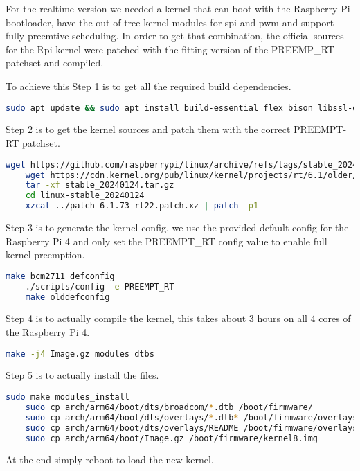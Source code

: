 For the realtime version we needed a kernel that can boot with the Raspberry Pi bootloader,
have the out-of-tree kernel modules for spi and pwm and support fully preemtive scheduling.
In order to get that combination, the official sources for the Rpi kernel were patched with the fitting version of the PREEMP\_RT patchset and compiled.

To achieve this Step 1 is to get all the required build dependencies.
\begin{lstlisting}[language=bash, breaklines]
    sudo apt update && sudo apt install build-essential flex bison libssl-dev bc
\end{lstlisting}

Step 2 is to get the kernel sources and patch them with the correct PREEMPT-RT patchset.
\begin{lstlisting}[language=bash, breaklines]
    wget https://github.com/raspberrypi/linux/archive/refs/tags/stable_20240124.tar.gz
    wget https://cdn.kernel.org/pub/linux/kernel/projects/rt/6.1/older/patch-6.1.73-rt22.patch.xz
    tar -xf stable_20240124.tar.gz
    cd linux-stable_20240124
    xzcat ../patch-6.1.73-rt22.patch.xz | patch -p1
\end{lstlisting}

Step 3 is to generate the kernel config, we use the provided default config for the Raspberry Pi 4 and only set the PREEMPT\_RT config value to enable full kernel preemption.
\begin{lstlisting}[language=bash, breaklines]
    make bcm2711_defconfig
    ./scripts/config -e PREEMPT_RT
    make olddefconfig
\end{lstlisting}

Step 4 is to actually compile the kernel, this takes about 3 hours on all 4 cores of the Raspberry Pi 4.
\begin{lstlisting}[language=bash, breaklines]
    make -j4 Image.gz modules dtbs
\end{lstlisting}

Step 5 is to actually install the files.
\begin{lstlisting}[language=bash, breaklines]
    sudo make modules_install
    sudo cp arch/arm64/boot/dts/broadcom/*.dtb /boot/firmware/
    sudo cp arch/arm64/boot/dts/overlays/*.dtb* /boot/firmware/overlays/
    sudo cp arch/arm64/boot/dts/overlays/README /boot/firmware/overlays/
    sudo cp arch/arm64/boot/Image.gz /boot/firmware/kernel8.img
\end{lstlisting}

At the end simply reboot to load the new kernel.

